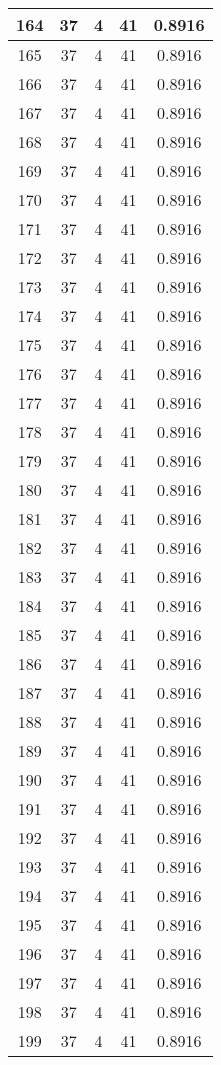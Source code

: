 \documentclass[letterpaper, 12pt]{article}
\begin{document}
\begin{longtable}{|c|c|c|c|c|}
\hline
164 & 37 & 4 & 41 & 0.8916 \\
\hline
165 & 37 & 4 & 41 & 0.8916 \\
\hline
166 & 37 & 4 & 41 & 0.8916 \\
\hline
167 & 37 & 4 & 41 & 0.8916 \\
\hline
168 & 37 & 4 & 41 & 0.8916 \\
\hline
169 & 37 & 4 & 41 & 0.8916 \\
\hline
170 & 37 & 4 & 41 & 0.8916 \\
\hline
171 & 37 & 4 & 41 & 0.8916 \\
\hline
172 & 37 & 4 & 41 & 0.8916 \\
\hline
173 & 37 & 4 & 41 & 0.8916 \\
\hline
174 & 37 & 4 & 41 & 0.8916 \\
\hline
175 & 37 & 4 & 41 & 0.8916 \\
\hline
176 & 37 & 4 & 41 & 0.8916 \\
\hline
177 & 37 & 4 & 41 & 0.8916 \\
\hline
178 & 37 & 4 & 41 & 0.8916 \\
\hline
179 & 37 & 4 & 41 & 0.8916 \\
\hline
180 & 37 & 4 & 41 & 0.8916 \\
\hline
181 & 37 & 4 & 41 & 0.8916 \\
\hline
182 & 37 & 4 & 41 & 0.8916 \\
\hline
183 & 37 & 4 & 41 & 0.8916 \\
\hline
184 & 37 & 4 & 41 & 0.8916 \\
\hline
185 & 37 & 4 & 41 & 0.8916 \\
\hline
186 & 37 & 4 & 41 & 0.8916 \\
\hline
187 & 37 & 4 & 41 & 0.8916 \\
\hline
188 & 37 & 4 & 41 & 0.8916 \\
\hline
189 & 37 & 4 & 41 & 0.8916 \\
\hline
190 & 37 & 4 & 41 & 0.8916 \\
\hline
191 & 37 & 4 & 41 & 0.8916 \\
\hline
192 & 37 & 4 & 41 & 0.8916 \\
\hline
193 & 37 & 4 & 41 & 0.8916 \\
\hline
194 & 37 & 4 & 41 & 0.8916 \\
\hline
195 & 37 & 4 & 41 & 0.8916 \\
\hline
196 & 37 & 4 & 41 & 0.8916 \\
\hline
197 & 37 & 4 & 41 & 0.8916 \\
\hline
198 & 37 & 4 & 41 & 0.8916 \\
\hline
199 & 37 & 4 & 41 & 0.8916 \\
\hline
\end{longtable}
\end{document}
